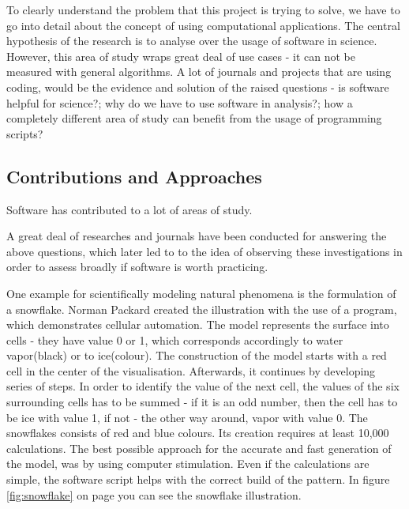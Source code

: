 
To clearly understand the problem that this project is trying to solve, we have to go into detail about the concept of using computational applications. The central hypothesis of the research is to analyse over the usage of software in science. However, this area of study wraps great deal of use cases - it can not be measured with general algorithms. A lot of journals and projects that are using coding, would be the evidence and solution of the raised questions - is software helpful for science?; why do we have to use software in analysis?; how a completely different area of study can benefit from the usage of programming scripts? 

\subsection*{Contributions and Approaches}

Software has contributed to a lot of areas of study.

A great deal of researches and journals have been conducted for answering the above questions, which later led to to the idea of observing these investigations in order to assess broadly if software is worth practicing. 

One example for scientifically modeling natural phenomena is the formulation of a snowflake. Norman Packard created the illustration with the use of a program, which demonstrates cellular automation.\cite{wolfram1984computer} \cite{packard1986lattice} The model represents the surface into cells - they have value 0 or 1, which corresponds accordingly to water vapor(black) or to ice(colour). The construction of the model starts with a red cell in the center of the visualisation. Afterwards, it continues by developing series of steps. In order to identify the value of the next cell, the values of the six surrounding cells has to be summed - if it is an odd number, then the cell has to be ice with value 1, if not - the other way around, vapor with value 0. The snowflakes consists of red and blue colours. Its creation requires at least 10,000 calculations. The best possible approach for the accurate and fast generation of the model, was by using computer stimulation. Even if the calculations are simple, the software script helps with the correct build of the pattern.\cite{wolfram1984computer} In figure \ref{fig:snowflake} on page \pageref{fig:snowflake} you can see the snowflake illustration.


